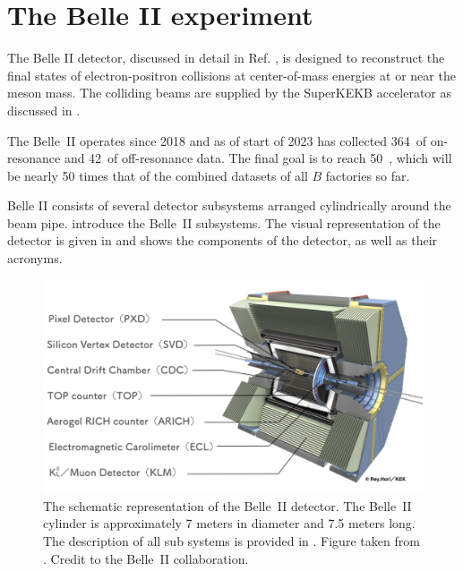 \section{The Belle II experiment}\label{sec:belle2}

The Belle II detector, discussed in detail in Ref. \cite{Belle-II:2010dht}, is designed to reconstruct the final states of electron-positron 
collisions at center-of-mass energies at or near the \FourS meson mass.
The colliding beams are supplied by the SuperKEKB accelerator as discussed in .

The Belle~II operates since 2018 and as of start of 2023 has collected 364~\invfb of on-resonance and 42~\invfb of off-resonance data.
The final goal is to reach 50~\invab, which will be nearly 50 times that of the combined datasets of all $B$ factories so far.

Belle II consists of several detector subsystems arranged cylindrically around the beam pipe. 
 introduce the Belle~II subsystems.
The visual representation of the detector is given in  and shows the components of the detector, as well as their acronyms.
\begin{figure}[htbp!]
    \includegraphics[width=1\textwidth]{figures/experimental_setup/belle2.png}
    \caption{\label{fig:belle2_detector} The schematic representation of the Belle~II detector.
    The Belle~II cylinder is approximately 7 meters in diameter and 7.5 meters long.
    The description of all sub systems is provided in .
    Figure taken from \cite{belle_2_picture}.
    Credit to the Belle~II collaboration.
    }
\end{figure}


